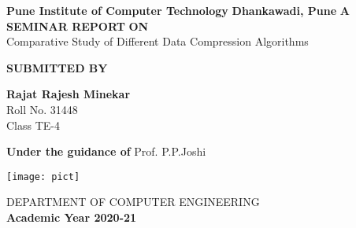 \documentclass[a4paper, 12pt]{article}
\begin{document}
 
\begin{titlepage}
    \begin{center}
        \vspace*{1cm}
        
        \large
                \textbf{Pune Institute of Computer Technology}	
                \linebreak
		\textbf{Dhankawadi, Pune}
        \vspace{0.5cm}
                        \linebreak
                        \linebreak
        \textbf{A SEMINAR REPORT }
        \linebreak
        \textbf{ON }
        \linebreak
        \vspace{0.5cm}
        \large
        \\Comparative Study of Different Data Compression Algorithms
        \linebreak
        \linebreak
		
		\textbf{SUBMITTED BY}
		\vspace{1cm}
		
        \textbf{ Rajat Rajesh Minekar }
        \\ Roll No. 31448
        \\ Class TE-4
        \linebreak
        \linebreak
		        
        \textbf{\large{Under the guidance of}}
		\linebreak
	    Prof. P.P.Joshi
		\linebreak
        
        
        
        \vspace{0.8cm}
        

        \texttt{[image: pict]}   
        
        \Large
        DEPARTMENT OF COMPUTER ENGINEERING\\
		\textbf{Academic Year 2020-21}
        
    \end{center}
\end{titlepage}
\pagebreak
\end{document}
